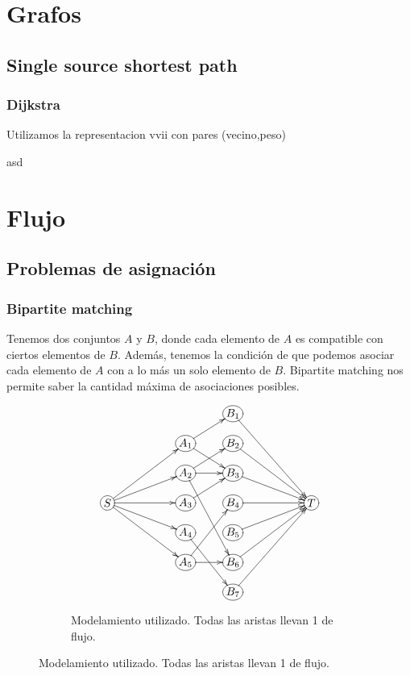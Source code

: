 \documentclass[oneside]{book}
\begin{document}
	
	\chapter{Grafos}
	\section{Single source shortest path}
	\subsection{Dijkstra}
	Utilizamos la representacion vvii con pares (vecino,peso)
	\begin{codigo}
	asd
	\end{codigo}
	\chapter{Flujo}
	\section{Problemas de asignaci\'on}
	\subsection{Bipartite matching}
	Tenemos dos conjuntos $A$ y $B$, donde cada elemento de $A$ es compatible con ciertos elementos de $B$. Adem\'as, tenemos la condici\'on de que podemos asociar cada elemento de $A$ con a lo m\'as un solo elemento de $B$. Bipartite matching nos permite saber la cantidad m\'axima de asociaciones posibles.
\begin{figure}[h]
\centering
\begin{subfigure}{.5\textwidth}
\begin{displaymath}
\xymatrix@R-1pc{
&&&*+[o][F-]{B_1} \ar[dddrr] \\
&&*+[o][F-]{A_1} \ar[ur] \ar[dr]
&*+[o][F-]{B_2} \ar[ddrr] \\
&&*+[o][F-]{A_2} \ar[r] \ar[dddr] \ar[ur]
&*+[o][F-]{B_3} \ar[drr] \\
*+[o][F-]{S} \ar[rruu] \ar[rru] \ar[rr] \ar[rrd] \ar[rrdd]
&&*+[o][F-]{A_3} \ar[ur]
&*+[o][F-]{B_4} \ar[rr]
&&*+[o][F-]{T} \\
&&*+[o][F-]{A_4} \ar[ddr]
&*+[o][F-]{B_5} \ar[urr] \\
&&*+[o][F-]{A_5} \ar[r] \ar[uur]
&*+[o][F-]{B_6} \ar[uurr] \\
&&&*+[o][F-]{B_7} \ar[uuurr]
}
\end{displaymath}
\caption*{Modelamiento utilizado. Todas las aristas llevan 1 de flujo.}
\end{subfigure}
\end{figure}
\end{document}
